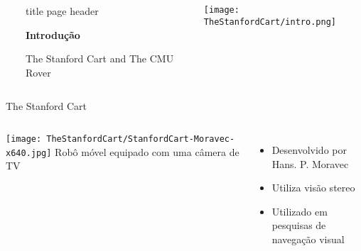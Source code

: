 \begin{frame}
    \begin{columns}
        ~\hfill
            \begin{beamercolorbox}[sep=8em, colsep*=18pt, wd=\textwidth,ht=\paperheight]{title page header}
                \begin{center}
                    \textbf{\huge{Introdução}}\par
                    \vspace*{0.3cm}
                    \vspace*{0.3cm}
                    The Stanford Cart and The CMU Rover
                \end{center}
            \end{beamercolorbox}%
        \begin{center}
            \texttt{[image: TheStanfordCart/intro.png]}
        \end{center}
            
    \end{columns}
  
 \end{frame}
\begin{frame}[t]{The Stanford Cart}
    \begin{columns}
            \texttt{[image: TheStanfordCart/StanfordCart-Moravec-x640.jpg]}
            Robô móvel equipado com uma câmera de TV
            \begin{itemize} 
                \item Desenvolvido por Hans. P. Moravec
                \item Utiliza visão stereo
                \item Utilizado em pesquisas de navegação visual
            \end{itemize}
            \end{columns}
\end{frame}

